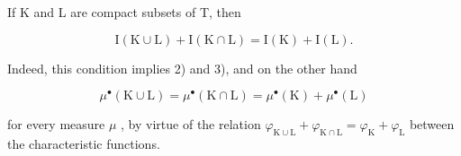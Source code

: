 If K and L are compact subsets of T, then

\[
\mathrm{I} (\mathrm{K} \cup \mathrm{L}) + \mathrm{I} (\mathrm{K} \cap \mathrm{L}) = \mathrm{I} (\mathrm{K}) + \mathrm{I} (\mathrm{L}).
\]

Indeed, this condition implies 2) and 3), and on the other hand

\[
\mu^ {\bullet} (\mathrm{K} \cup \mathrm{L}) = \mu^ {\bullet} (\mathrm{K} \cap \mathrm{L}) = \mu^ {\bullet} (\mathrm{K}) + \mu^ {\bullet} (\mathrm{L})
\]

for every measure \(\mu\) , by virtue of the relation \(\varphi_{\mathrm{K}\cup\mathrm{L}} + \varphi_{\mathrm{K}\cap\mathrm{L}} = \varphi_{\mathrm{K}} + \varphi_{\mathrm{L}}\) between the characteristic functions.

